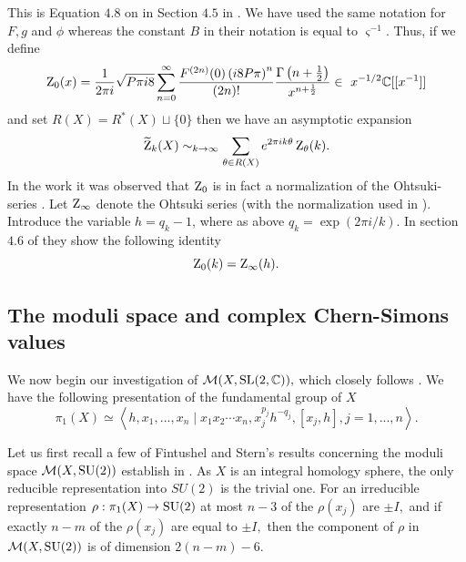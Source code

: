 This is Equation $4.8$ on in Section $4.5$ in \cite{LawrenceRozansky}. We have used the same notation for $F,g$ and $\phi$ whereas the constant $B$ in their notation is equal to $\varsigma^{-1}$. 
Thus, if we define \begin{equation}
\operatorname{Z}_{0}(x)= \frac{1}{2 \pi i} \sqrt{ P\pi i 8} \sum_{n=0}^{\infty} \frac{F^{(2n)}(0)\left(i8P\pi \right)^{n}}{(2n)!}  \frac{\Gamma\left(n+\frac{1}{2} \right)}{x^{n+\frac{1}{2}}} \in \ x^{-1/2}\mathbb{C}[[x^{-1}]]
\end{equation} 
and set $R(X)=R^*(X) \sqcup \{0\}$ then we have an asymptotic expansion
\begin{equation} \label{expansionX}
\widetilde {\operatorname{Z}}_k(X) \sim_{k \rightarrow \infty} \sum_{\theta\in R(X)} e^{2\pi i k \theta}  \operatorname{Z}_{\theta}(k).
\end{equation}
  In the work \cite{LawrenceRozansky} it was observed that $\operatorname{Z}_{0}$ is in fact a normalization of the Ohtsuki-series \cite{Ohtsuki95,Ohtsuki96a,Ohtsuki96b}. Let $\operatorname{Z}_{\infty}$ denote the Ohtsuki series (with the normalization used in \cite{LawrenceRozansky}). Introduce the variable $h=q_k-1$, where as above $q_k=\exp(2\pi i/k)$. In section $4.6$ of \cite{LawrenceZagier}  they show the following identity
  \begin{equation} \label{eq:Ohtsuki}
\operatorname{Z}_0(k) = \operatorname{Z}_{\infty}(h).
  \end{equation}
  
\subsection{The moduli space and complex Chern-Simons values}


We now begin our investigation of $\mathcal{M}(X,\operatorname{SL}(2,\mathbb{C})),$ which closely follows \cite{FintushelStern90}. We have the following presentation of the fundamental group of $X$
\begin{equation} \label{presentation}
\pi_1(X) \simeq \left\langle h,  x_1,...,x_n \mid  x_1x_2\cdots x_n, x_j^{p_j}h^{-q_j}, [x_j,h], j=1,...,n  \right\rangle.
\end{equation}

Let us first recall a few of Fintushel and Stern's results concerning the moduli space $\mathcal{M}(X,\operatorname{SU}(2))$  establish in \cite{FintushelStern90}. As $X$ is an integral homology sphere, the only reducible representation into $SU(2)$ is the trivial one. For an irreducible representation $\rho:\pi_1(X) \rightarrow \operatorname{SU}(2)$ at most $n-3$ of the $\rho(x_j)$ are $\pm I,$ and if exactly $n-m$ of the $\rho(x_j)$ are equal to $\pm I,$ then the component of $\rho$ in $\mathcal{M}(X,\operatorname{SU}(2))$ is of dimension $2(n-m)-6.$

